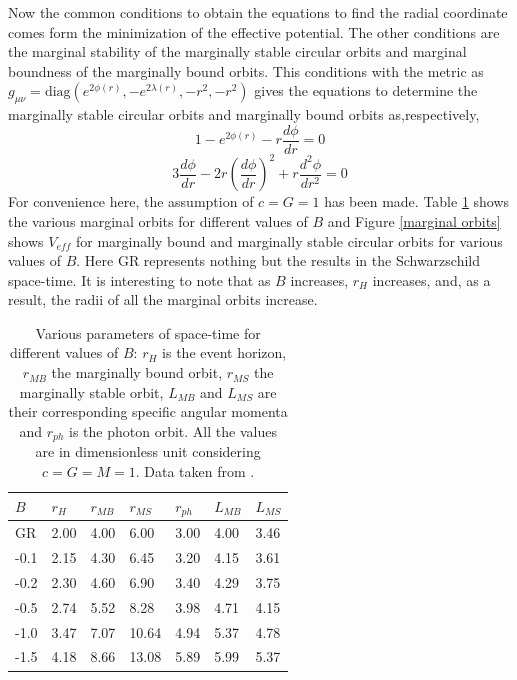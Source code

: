 \documentclass[12pt,a4paper,oneside]{book}
\newcommand{\eq}[2]{\begin{equation} \label{eq:#1} #2 \end{equation}}
\begin{document}
Now the common conditions to obtain the equations to find the radial coordinate comes form the minimization of the effective potential. The other conditions are the marginal stability of the marginally stable circular orbits and marginal boundness of the marginally bound orbits. This conditions with the metric as $g_{\mu\nu}=\text{diag}\left(e^{2\phi(r)},-e^{2\lambda(r)},-r^2,-r^2\right)$ gives the equations to determine the marginally stable circular orbits and marginally bound orbits as,respectively,
\eq{}{1-e^{2\phi(r)}-r\frac{d\phi}{dr}=0}
\eq{}{3\frac{d\phi}{dr}-2r\left(\frac{d\phi}{dr}\right)^2+r\frac{d^2\phi}{dr^2}=0}
For convenience here, the assumption of $c=G=1$ has been made. Table \ref{parameters of space-time} shows the various marginal orbits for different values of $B$ and Figure \ref{marginal orbits} shows $V_{eff}$ for marginally bound and marginally stable circular orbits for various values of $B$. Here GR represents nothing but the results in the Schwarzschild space-time. It is interesting to note that as $B$ increases, $r_{H}$ increases, and, as a result, the radii of all the marginal orbits increase.

\begin{table}[!htp]
\centering
\begin{tabular}{|l|l|l|l|l|l|l|}
\hline
$B$ & $r_{H}$ & $r_{MB}$ & $r_{MS}$ & $r_{ph}$ & $L_{MB}$ & $L_{MS}$\\
\hline
GR & 2.00 & 4.00 & 6.00 & 3.00 & 4.00 & 3.46\\ 
-0.1 & 2.15 & 4.30 & 6.45 & 3.20 & 4.15 & 3.61\\ 
-0.2 & 2.30 & 4.60 & 6.90 & 3.40 & 4.29 & 3.75\\ 
-0.5 & 2.74 & 5.52 & 8.28 & 3.98 & 4.71 & 4.15\\ 
-1.0 & 3.47 & 7.07 & 10.64 & 4.94 & 5.37 & 4.78\\ 
-1.5 & 4.18 & 8.66 & 13.08 & 5.89 & 5.99 & 5.37\\ 
\hline
\end{tabular}
\caption{Various parameters of space-time for different values of $B$: $r_{H}$ is the event horizon, $r_{MB}$ the marginally bound orbit, $r_{MS}$ the marginally stable orbit, $L_{MB}$ and $L_{MS}$ are their corresponding specific angular momenta and $r_{ph}$ is the photon orbit. All the values are in dimensionless unit considering $c=G=M=1$. Data taken from \cite{Kalita_Bani}.}
\label{parameters of space-time}
\end{table}
\end{document}
